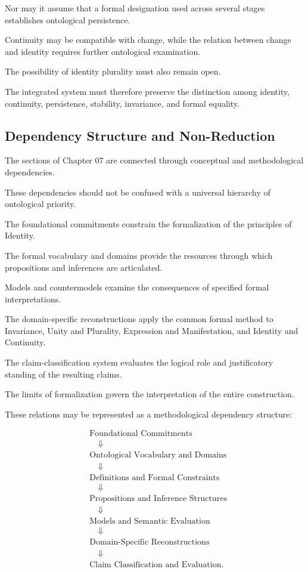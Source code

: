 Nor may it assume
that a formal designation
used across several
stages establishes
ontological persistence.

Continuity may be compatible
with change, while
the relation between
change and identity
requires further ontological
examination.

The possibility of
identity plurality must
also remain open.

The integrated system
must therefore preserve
the distinction among
identity, continuity,
persistence, stability,
invariance, and formal
equality.

\subsection{Dependency Structure and Non-Reduction}

The sections of Chapter 07
are connected through
conceptual and methodological
dependencies.

These dependencies should
not be confused with
a universal hierarchy
of ontological priority.

The foundational commitments
constrain the formalization
of the principles of
Identity.

The formal vocabulary
and domains provide
the resources through
which propositions and
inferences are articulated.

Models and countermodels
examine the consequences
of specified formal
interpretations.

The domain-specific
reconstructions apply
the common formal
method to Invariance,
Unity and Plurality,
Expression and Manifestation,
and Identity and Continuity.

The claim-classification
system evaluates the
logical role and
justificatory standing
of the resulting claims.

The limits of formalization
govern the interpretation
of the entire construction.

These relations may be
represented as a
methodological dependency
structure:

\[
\begin{aligned}
&\text{Foundational Commitments}\\
&\quad\Downarrow\\
&\text{Ontological Vocabulary and Domains}\\
&\quad\Downarrow\\
&\text{Definitions and Formal Constraints}\\
&\quad\Downarrow\\
&\text{Propositions and Inference Structures}\\
&\quad\Downarrow\\
&\text{Models and Semantic Evaluation}\\
&\quad\Downarrow\\
&\text{Domain-Specific Reconstructions}\\
&\quad\Downarrow\\
&\text{Claim Classification and Evaluation}.
\end{aligned}
\]

